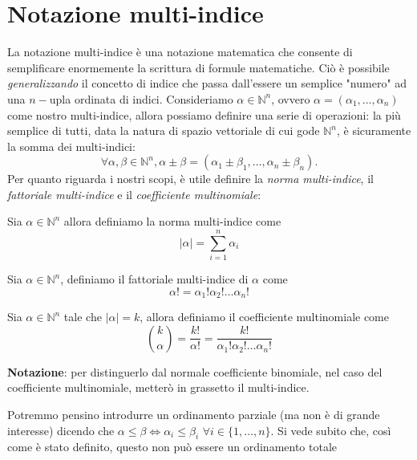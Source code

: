 \chapter{Notazione multi-indice}
\pagestyle{plain}
\thispagestyle{empty}
\pagestyle{fancy}
La notazione multi-indice è una notazione matematica che consente di semplificare enormemente 
la scrittura di formule matematiche. Ciò è possibile \emph{generalizzando} il concetto di indice che passa dall'essere
un semplice "numero" ad una $n-$upla ordinata di indici. Consideriamo $\alpha \in \mathbb{N}^n$, ovvero $\alpha = (\alpha_1, \ldots, \alpha_n)$ come nostro multi-indice, allora possiamo definire una serie di operazioni: la più semplice di tutti, data la natura di spazio vettoriale di cui gode $\mathbb{N}^n$, è sicuramente la somma dei multi-indici:
$$
\forall \alpha, \beta \in \mathbb{N}^n, \alpha \pm \beta = (\alpha_1 \pm \beta_1, \ldots, \alpha_n \pm \beta_n).
$$
Per quanto riguarda i nostri scopi, è utile definire la \emph{norma multi-indice}, il \emph{fattoriale multi-indice} e il \emph{coefficiente multinomiale}:
\vspace{0.5cm}
\begin{definition}[\textcolor{blue}{norma multi-indice}]
	Sia $\alpha \in \mathbb{N}^n$ allora definiamo la norma multi-indice come
	$$
	|\alpha| = \sum_{i=1}^n \alpha_i
	$$
\end{definition}
\vspace{0.5cm}
\begin{definition}[\textcolor{blue}{fattoriale multi-indice}]
	Sia $\alpha \in \mathbb{N}^n$, definiamo il fattoriale multi-indice di $\alpha$ come
	$$
	\alpha! = \alpha_1 ! \alpha_2 ! \ldots \alpha_n !
	$$
\end{definition}
\vspace{0.5cm}
\begin{definition}[\textcolor{blue}{coefficiente multinomiale}]
	Sia $\alpha \in \mathbb{N}^n$ tale che $|\alpha| = k$, allora definiamo il coefficiente multinomiale come
	$$
	\binom{k}{\alpha} = \frac{k!}{\alpha!} = \frac{k!}{\alpha_1 ! \alpha_2 ! \ldots \alpha_n !}
	$$
\end{definition}
%
\textbf{Notazione}: per distinguerlo dal normale coefficiente binomiale, nel caso del coefficiente multinomiale, metterò in grassetto il multi-indice.
%
\begin{remark}
	Potremmo pensino introdurre un ordinamento parziale (ma non è di grande interesse) dicendo che $\alpha \leq \beta \iff \alpha_i \leq \beta_i \, \, \forall i \in \{1, \ldots, n \}$. Si vede subito che, così come è stato definito, questo non può essere un ordinamento totale
\end{remark}
